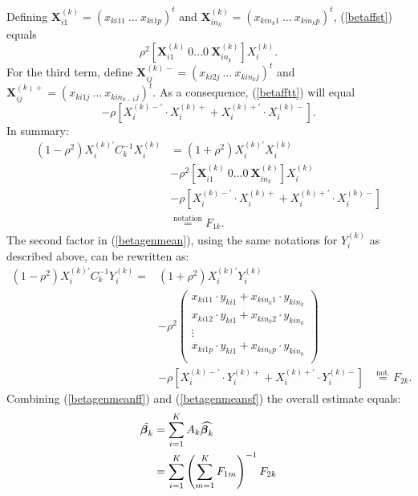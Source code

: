 \documentclass[11pt,a5paper,twoside]{book}
\newcommand{\bfbeta}{\mbox{\boldmath $\beta$}}
\begin{document}
{Defining $\boldsymbol{X}_{i1}^{(k)}=(x_{ki11} \ \hdots \ x_{ki1p})^t$ and $\boldsymbol{X}_{in_k}^{(k)}=(x_{kin_k1} \ \hdots \ x_{kin_kp})^t$, (\ref{betaffst}) equals
\begin{equation}
\rho^2[\boldsymbol{X}_{i1}^{(k)} \ 0 \hdots 0 \ \boldsymbol{X}_{in_k}^{(k)}] X_i^{(k)}.
\end{equation}
For the third term, define $\boldsymbol{X}_{ij}^{(k)-}=(x_{ki2j} \ \hdots \ x_{kin_kj})^t$ and $\boldsymbol{X}_{ij}^{(k)+}=(x_{ki1j} \ \hdots \ x_{kin_{k-1}j})^t$. As a consequence, (\ref{betafftt}) will equal
\begin{equation}
-\rho [X_i^{(k)-'} \cdot X_i^{(k)+}+X_i^{(k)+'} \cdot X_i^{(k)-}].
\end{equation}
In summary:
\begin{equation}
\begin{aligned}
(1-\rho^2) X_{i}^{(k)'}C_k^{-1}X_{i}^{(k)} &= (1+\rho^2)X_{i}^{(k)'}X_{i}^{(k)} \\
&-\rho^2[\boldsymbol{X}_{i1}^{(k)} \ 0 \hdots 0 \ \boldsymbol{X}_{in_k}^{(k)}] X_i^{(k)} \\
&-\rho [X_i^{(k)-'} \cdot X_i^{(k)+}+X_i^{(k)+'} \cdot X_i^{(k)-}] \\
&\overset{\text{notation}}= F_{1k}. \label{betagenmeanff}
\end{aligned}
\end{equation}
The second factor in (\ref{betagenmean}), using the same notations for $Y_i^{(k)}$ as described above, can be rewritten as:
\begin{equation}
\begin{aligned}
(1-\rho^2) X_{i}^{(k)'}C_k^{-1}Y_{i}^{(k)} =& (1+\rho^2)X_{i}^{(k)'}Y_{i}^{(k)} \\
&- \rho^2 \begin{pmatrix}
x_{ki11}\cdot y_{ki1} + x_{kin_k1}\cdot y_{kin_k}  \\
x_{ki12}\cdot y_{ki1} + x_{kin_k2}\cdot y_{kin_k}  \\
\vdots \\
x_{ki1p}\cdot y_{ki1} + x_{kin_kp}\cdot y_{kin_k} \\
\end{pmatrix}  \\
&-\rho [X_i^{(k)-'} \cdot Y_i^{(k)+}+X_i^{(k)+'} \cdot Y_i^{(k)-}]  
&\overset{\text{not.}}= F_{2k}.\label{betagenmeansf}
\end{aligned}
\end{equation}
Combining (\ref{betagenmeanff}) and (\ref{betagenmeansf}) the overall estimate equals:
\begin{equation}
\begin{aligned}
\tilde{\bfbeta_k}&=\sum_{i=1}^K A_k \widehat{\bfbeta_k} \\
&=\sum_{i=1}^K \left( \sum_{m=1}^K F_{1m} \right)^{-1} F_{2k}
\end{aligned}
\end{equation}
}
\end{document}
